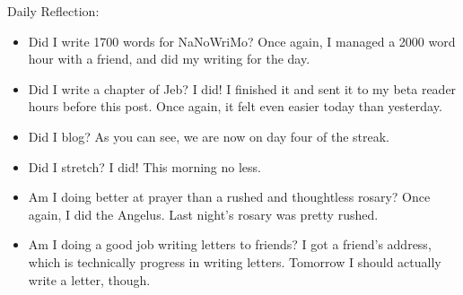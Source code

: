 \documentclass[12pt]{article}[titlepage]
\newcommand{\1}{\={a}}
\newcommand{\2}{\={e}}
\newcommand{\3}{\={\i}}
\newcommand{\4}{\=o}
\newcommand{\5}{\=u}
\newcommand{\6}{\={A}}
\renewcommand{\,}{\textsuperscript{,}}
\begin{document}
Daily Reflection:
\begin{itemize}
\item Did I write 1700 words for NaNoWriMo? Once again, I managed a 2000 word hour with a friend, and did my writing for the day.
\item Did I write a chapter of Jeb? I did! I finished it and sent it to my beta reader hours before this post. Once again, it felt even easier today than yesterday.
\item Did I blog? As you can see, we are now on day four of the streak.
\item Did I stretch? I did! This morning no less.
\item Am I doing better at prayer than a rushed and thoughtless rosary? Once again, I did the Angelus.
Last night's rosary was pretty rushed.
\item Am I doing a good job writing letters to friends?
I got a friend's address, which is technically progress in writing letters.
Tomorrow I should actually write a letter, though.
\end{itemize}
\end{document}
